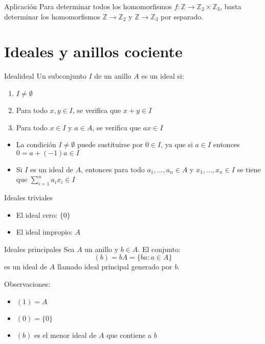 \begin{example}{Aplicación}{}
    Para determinar todos los homomorfismos \(f: \mathbb{Z} \to \mathbb{Z}_2 \times \mathbb{Z}_3\), basta determinar los homomorfismos \(\mathbb{Z} \to \mathbb{Z}_2\) y \(\mathbb{Z} \to \mathbb{Z}_3\) por separado.
\end{example}

\clearpage
\section{Ideales y anillos cociente}

\begin{definition}{Ideal}{ideal}
    Un subconjunto \(I\) de un anillo \(A\) es un {ideal} si:
    \begin{enumerate}
        \item \(I \neq \emptyset\)
        \item Para todo \(x, y \in I\), se verifica que \(x + y \in I\)
        \item Para todo \(x \in I\) y \(a \in A\), se verifica que \(ax \in I\)
    \end{enumerate}
\end{definition}

\begin{remark}
    \begin{itemize}
        \item La condición \(I \neq \emptyset\) puede sustituirse por \(0 \in I\), ya que si \(a \in I\) entonces \(0 = a + (-1)a \in I\)
        \item Si \(I\) es un ideal de \(A\), entonces para todo \(a_1, \ldots, a_n \in A\) y \(x_1, \ldots, x_n \in I\) se tiene que \(\sum_{i=1}^n a_i x_i \in I\)
    \end{itemize}
\end{remark}

\begin{example}{Ideales triviales}{}
    \begin{itemize}
        \item El {ideal cero}: \(\{0\}\)
        \item El {ideal impropio}: \(A\)
    \end{itemize}
\end{example}

\begin{example}{Ideales principales}{}
    Sea \(A\) un anillo y \(b \in A\). El conjunto:
    \[
    (b) = bA = \{ba : a \in A\}
    \]
    es un ideal de \(A\) llamado {ideal principal generado por \(b\)}.
    
    Observaciones:
    \begin{itemize}
        \item \((1) = A\)
        \item \((0) = \{0\}\)
        \item \((b)\) es el menor ideal de \(A\) que contiene a \(b\)
    \end{itemize}
\end{example}

